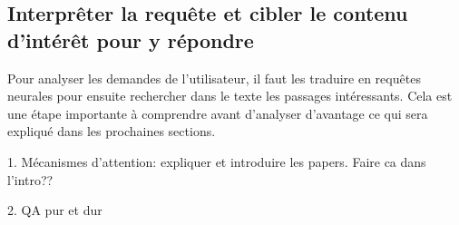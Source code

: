 \subsection{Interprêter la requête et cibler le contenu d'intérêt pour y répondre}

Pour analyser les demandes de l'utilisateur, il faut les traduire en requêtes neurales pour ensuite rechercher dans le texte les passages intéressants. Cela est une étape importante à comprendre avant d'analyser d'avantage ce qui sera expliqué dans les prochaines sections.

1. Mécanismes d’attention: expliquer et introduire les papers. Faire ca dans l’intro??

2. QA pur et dur
